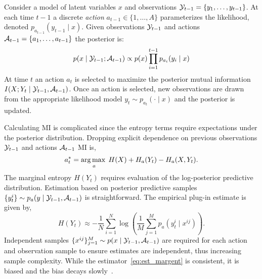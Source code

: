 Consider a model of latent variables $x$ and observations $\mathcal{Y}_{t-1}
= \{y_1,\ldots,y_{t-1}\}$.  At each time $t-1$ a discrete
\emph{action} $a_{t-1} \in \{1,\ldots,A\}$ parameterizes the
likelihood, denoted \mbox{$p_{a_{t-1}}(y_{t-1} \mid x)$}.  Given
observations $\mathcal{Y}_{t-1}$ and actions $\mathcal{A}_{t-1} =
\{a_1,\ldots,a_{t-1}\}$ the posterior is:
\begin{equation}\label{eq:conditional_indep_joint}
  p(x\mid \mathcal{Y}_{t-1}; \mathcal{A}_{t-1}) \propto p(x)
    \prod_{i=1}^{t-1} p_{a_i}(y_i \mid x) 
\end{equation}
At time $t$ an action $a_t$ is selected to maximize the posterior
mutual information \mbox{$I(X;Y_t \mid \mathcal{Y}_{t-1}, \mathcal{A}_{t-1})$}.
Once an action is selected, new observations are drawn from the
appropriate likelihood model $y_t \sim p_{a_t}(\cdot \mid x)$ and
the posterior is updated.

Calculating MI is complicated since the entropy terms require
expectations under the posterior distribution.  Dropping explicit
dependence on previous observations $\mathcal{Y}_{t-1}$ and actions
$\mathcal{A}_{t-1}$ MI is,
\begin{equation}
  a_t^{*} = \operatorname*{arg\,max\;}_a H(X) + H_a(Y_t) - H_a(X, Y_t). \notag
\end{equation}
The marginal entropy $H(Y_t)$ requires evaluation of the log-posterior
predictive distribution.  Estimation based on posterior predictive
samples $\{y^i_t\} \sim p_a(y\mid \mathcal{Y}_{t-1}, \mathcal{A}_{t-1})$ is
straightforward.  The empirical plug-in estimate is given by,
\begin{equation}\label{eq:est_margent}
  H(Y_t) \approx - \frac{1}{N} \sum_{i=1}^N \log\left( \frac{1}{M}
  \sum_{j=1}^M p_a(y_t^i \mid x^{ij}) \right).
\end{equation}
Independent samples $\{x^{ij}\}_{j=1}^M \sim p(x \mid \mathcal{Y}_{t-1},
\mathcal{A}_{t-1})$ are required for each action and observation sample to
ensure estimates are independent, thus increasing sample complexity.
While the estimator~\eqref{eq:est_margent} is consistent, it is biased
and the bias decays slowly~\citep{zheng2018robust,
  rainforth2018nesting}.

